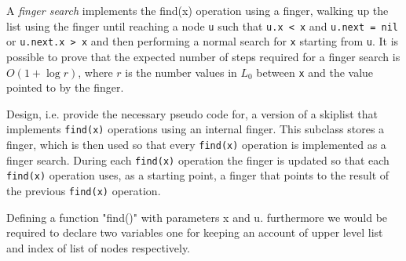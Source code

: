 \documentclass[addpoints]{exam}
\begin{document}
\begin{questions}
  A \textit{finger search} implements the find(x) operation using a finger, walking up the list using the finger until reaching a node \texttt{u} such that \texttt{u.x < x} and \texttt{u.next = nil} or \texttt{u.next.x > x} and then performing a normal search for \texttt{x} starting from \texttt{u}. It is possible to prove that the expected number of steps required for a finger search is $O(1+\log r)$, where $r$ is the number values in $L_0$ between \texttt{x} and the value pointed to by the finger.

  Design, i.e. provide the necessary pseudo code for, a version of a skiplist that implements \texttt{find(x)} operations using an internal finger. This subclass stores a finger, which is then used so that every \texttt{find(x)} operation is implemented as a finger search. During each \texttt{find(x)} operation the finger is updated so that each \texttt{find(x)} operation uses, as a starting point, a finger that points to the result of the previous \texttt{find(x)} operation.
  \begin{solution}
  Defining a function "find()" with parameters x and u. furthermore we would be required to declare two variables one for keeping an account of upper level  list and index of list of nodes respectively.\\
  


\end{solution}
\end{questions}
\end{document}
